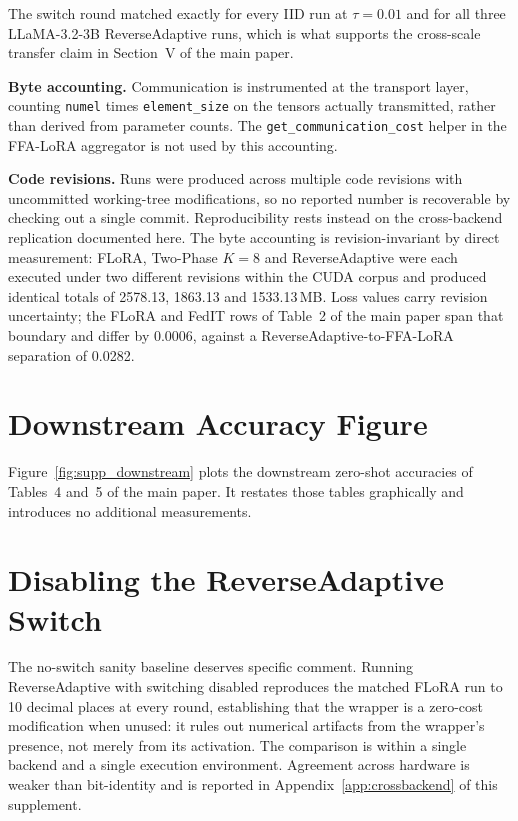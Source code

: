 \documentclass{ieeetj}
\begin{document}
The switch round matched exactly for every IID run at $\tau{=}0.01$ and for all three LLaMA-3.2-3B ReverseAdaptive runs, which is what supports the cross-scale transfer claim in Section~V of the main paper.

\textbf{Byte accounting.} Communication is instrumented at the transport layer, counting \texttt{numel} times \texttt{element\_size} on the tensors actually transmitted, rather than derived from parameter counts. The \texttt{get\_communication\_cost} helper in the FFA-LoRA aggregator is not used by this accounting.

\textbf{Code revisions.} Runs were produced across multiple code revisions with uncommitted working-tree modifications, so no reported number is recoverable by checking out a single commit. Reproducibility rests instead on the cross-backend replication documented here. The byte accounting is revision-invariant by direct measurement: FLoRA, Two-Phase $K{=}8$ and ReverseAdaptive were each executed under two different revisions within the CUDA corpus and produced identical totals of 2578.13, 1863.13 and 1533.13\,MB. Loss values carry revision uncertainty; the FLoRA and FedIT rows of Table~2 of the main paper span that boundary and differ by 0.0006, against a ReverseAdaptive-to-FFA-LoRA separation of 0.0282.

\section{Downstream Accuracy Figure}
\label{app:downstream_figure}
Figure~\ref{fig:supp_downstream} plots the downstream zero-shot accuracies of
Tables~4 and~5 of the main paper. It restates those tables graphically and
introduces no additional measurements.

\section{Disabling the ReverseAdaptive Switch}
\label{app:noswitch}
The no-switch sanity baseline deserves specific comment. Running ReverseAdaptive with switching disabled reproduces the matched FLoRA \cite{wang2024flora} run to 10 decimal places at every round, establishing that the wrapper is a zero-cost modification when unused: it rules out numerical artifacts from the wrapper's presence, not merely from its activation. The comparison is within a single backend and a single execution environment. Agreement across hardware is weaker than bit-identity and is reported in Appendix~\ref{app:crossbackend} of this supplement.
\end{document}
